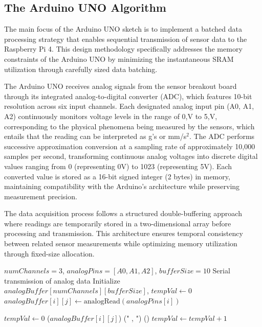 \subsection{The Arduino UNO Algorithm} 
\label{subsec:arduino}
{
	The main focus of the Arduino UNO sketch is to implement a batched data processing strategy that enables sequential transmission of sensor data to the Raspberry Pi 4. This design methodology specifically addresses the memory constraints of the Arduino UNO by minimizing the instantaneous SRAM utilization through carefully sized data batching.
	
	The Arduino UNO receives analog signals from the sensor breakout board through its integrated analog-to-digital converter (ADC), which features 10-bit resolution across six input channels. Each designated analog input pin (A0, A1, A2) continuously monitors voltage levels in the range of 0,V to 5,V, corresponding to the physical phenomena being measured by the sensors, which entails that the reading can be interpreted as g's or mm/s$^2$. The ADC performs successive approximation conversion at a sampling rate of approximately 10,000 samples per second, transforming continuous analog voltages into discrete digital values ranging from 0 (representing 0V) to 1023 (representing 5V). Each converted value is stored as a 16-bit signed integer (2 bytes) in memory, maintaining compatibility with the Arduino's architecture while preserving measurement precision.
	
	The data acquisition process follows a structured double-buffering approach where readings are temporarily stored in a two-dimensional array before processing and transmission. This architecture ensures temporal consistency between related sensor measurements while optimizing memory utilization through fixed-size allocation.
		
	\begin{algorithm}[H]
		\caption{Snippet of Data Acquisition \& Transmission (see the whole code on Appendix Section \ref{subsec:arduino-algorithm})}
		\label{alg:dataacq}
		\begin{algorithmic}[1]
			\REQUIRE $numChannels = 3$, $analogPins = [A0, A1, A2]$, $bufferSize = 10$
			\ENSURE Serial transmission of analog data
			\STATE Initialize $analogBuffer[numChannels][bufferSize]$, $tempVal \gets 0$
			\STATE $analogBuffer[i][j] \gets \text{analogRead}(analogPins[i])$
			\ENDFOR
			\ENDFOR
			
			\STATE $tempVal \gets 0$ 
			\ELSE
			\STATE {}($analogBuffer[i][j]$)
			 \STATE {}(" , ") \ENDIF
			\ENDFOR
			\STATE {}()
			\ENDFOR
			\STATE $tempVal \gets tempVal + 1$
			\ENDIF
			\ENDWHILE
		\end{algorithmic}
	\end{algorithm}
	

}
